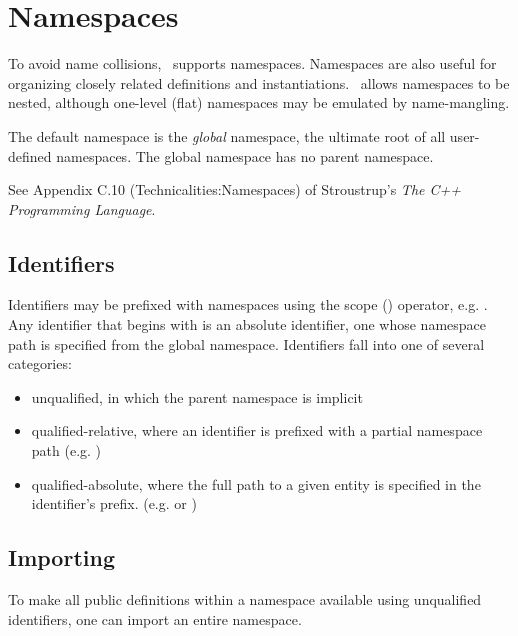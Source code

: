 
\chapter{Namespaces}
\label{sec:namespaces}

To avoid name collisions, \artxx\ supports namespaces.  
Namespaces are also useful for organizing closely related definitions
and instantiations.  
\artxx\ allows namespaces to be nested, although one-level (flat)
namespaces may be emulated by name-mangling.  

The default namespace is the \emph{global} namespace, 
the ultimate root of all user-defined namespaces.  
The global namespace has no parent namespace.  

See Appendix C.10 (Technicalities:Namespaces) of 
Stroustrup's \textit{The C++ Programming Language}.  

\section{Identifiers}
\label{sec:namespaces:identifiers}

Identifiers may be prefixed with namespaces using the 
scope (\ttt{::}) operator, e.g. .  
Any identifier that begins with \ttt{::} is an absolute identifier, 
one whose namespace path is specified from the global namespace.  
Identifiers fall into one of several categories:

\begin{itemize}
\item unqualified, in which the parent namespace is implicit
\item qualified-relative, where an identifier is prefixed with a
	partial namespace path (e.g. )
\item qualified-absolute, where the full path to a given entity is 
	specified in the identifier's prefix.  
	(e.g.  or )
\end{itemize}


\section{Importing}
\label{sec:namespaces:import}

To make all public definitions within a namespace available
using unqualified identifiers, one can import an entire namespace.  

